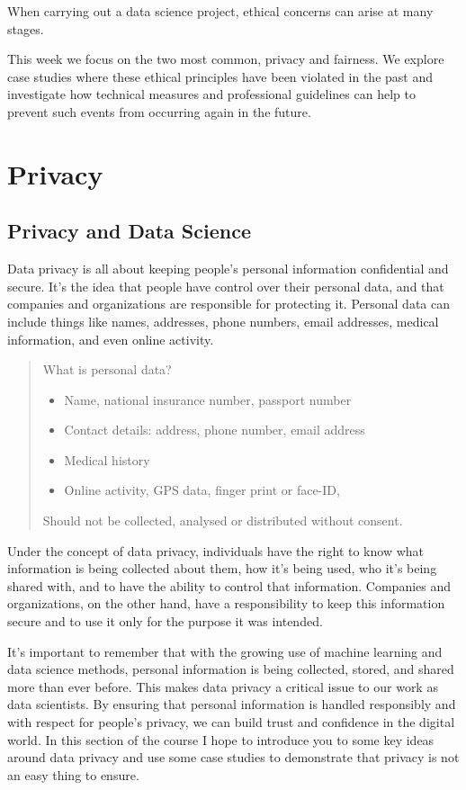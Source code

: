 \documentclass[
  letterpaper,
  DIV=11,
  numbers=noendperiod]{scrreprt}
\providecommand{\tightlist}{%
  \setlength{\itemsep}{0pt}\setlength{\parskip}{0pt}}\usepackage{longtable,booktabs,array}
\begin{document}
When carrying out a data science project, ethical concerns can arise at
many stages.

This week we focus on the two most common, privacy and fairness. We
explore case studies where these ethical principles have been violated
in the past and investigate how technical measures and professional
guidelines can help to prevent such events from occurring again in the
future.

\chapter{Privacy}\label{ethics-privacy}

\section{Privacy and Data Science}\label{privacy-and-data-science}

Data privacy is all about keeping people's personal information
confidential and secure. It's the idea that people have control over
their personal data, and that companies and organizations are
responsible for protecting it. Personal data can include things like
names, addresses, phone numbers, email addresses, medical information,
and even online activity.

\begin{quote}
What is personal data?

\begin{itemize}
\tightlist
\item
  Name, national insurance number, passport number
\item
  Contact details: address, phone number, email address
\item
  Medical history
\item
  Online activity, GPS data, finger print or face-ID,
\end{itemize}

Should not be collected, analysed or distributed without consent.
\end{quote}

Under the concept of data privacy, individuals have the right to know
what information is being collected about them, how it's being used, who
it's being shared with, and to have the ability to control that
information. Companies and organizations, on the other hand, have a
responsibility to keep this information secure and to use it only for
the purpose it was intended.

It's important to remember that with the growing use of machine learning
and data science methods, personal information is being collected,
stored, and shared more than ever before. This makes data privacy a
critical issue to our work as data scientists. By ensuring that personal
information is handled responsibly and with respect for people's
privacy, we can build trust and confidence in the digital world. In this
section of the course I hope to introduce you to some key ideas around
data privacy and use some case studies to demonstrate that privacy is
not an easy thing to ensure.
\end{document}
